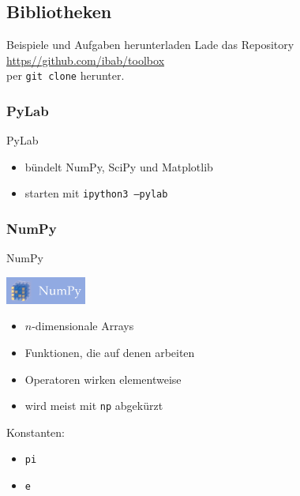 
\subsection{Bibliotheken}

\begin{frame}{Beispiele und Aufgaben herunterladen}
  Lade das Repository \\
  \url{https//github.com/ibab/toolbox} \\
  per \texttt{git clone} herunter.
\end{frame}

\subsubsection{PyLab}
\begin{frame}{PyLab}
  \begin{itemize}
    \item bündelt NumPy, SciPy und Matplotlib
    \item starten mit \texttt{ipython3 --pylab}
  \end{itemize}
\end{frame}

\subsubsection{NumPy}
\begin{frame}{NumPy}
  \begin{center}
    \includegraphics[width=100px]{../Notes/img/numpy.png}
  \end{center}
  \begin{itemize}
    \item $n$-dimensionale Arrays
    \item Funktionen, die auf denen arbeiten
    \item Operatoren wirken elementweise
    \item wird meist mit \texttt{np} abgekürzt
  \end{itemize}

  Konstanten:
  \begin{itemize}
    \item \texttt{pi}
    \item \texttt{e}
  \end{itemize}
\end{frame}

